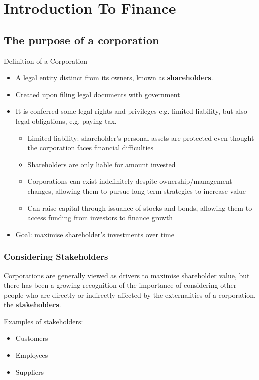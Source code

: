 \chapter{Introduction To Finance}


\section{The purpose of a corporation}

\begin{definitionbox}{Definition of a Corporation}
    \begin{itemize}
    \item A legal entity distinct from its owners, known as \textbf{shareholders}.
    \item Created upon filing legal documents with government
    \item It is conferred some legal rights and privileges e.g. limited liability, but also legal obligations, e.g. paying tax.
\begin{itemize}
        \item Limited liability: shareholder's personal assets are protected even thought the corporation faces financial difficulties
        \item Shareholders are only liable for amount invested
        \item Corporations can exist indefinitely despite ownership/management changes, allowing them to pursue long-term strategies to increase value
        \item Can raise capital through issuance of stocks and bonds, allowing them to access funding from investors to finance growth  
\end{itemize}
    \item Goal: maximise shareholder's investments over time
\end{itemize}
\end{definitionbox}

\subsection*{Considering Stakeholders}
Corporations are generally viewed as drivers to maximise shareholder value, but there has been a growing recognition of the importance of considering other people who are directly or indirectly affected by the externalities of a corporation, the \textbf{stakeholders}. 

Examples of stakeholders:
\begin{itemize}
    \item Customers
    \item Employees
    \item Suppliers
\end{itemize}

